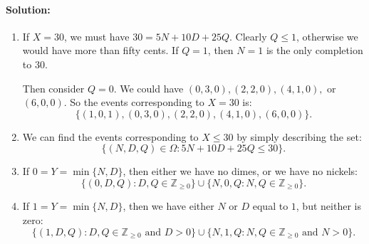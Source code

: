 \documentclass{article}
\begin{document}
\begin{enumerate}
\begin{enumerate}
        \paragraph{Solution: }
        \begin{enumerate}
            \item If $X=30$, we must have $30=5N+10D+25Q$. Clearly  $Q\leq 1$, otherwise we would have more than fifty cents. If $Q=1$, then $N=1$ is the only completion to $30$.

                Then consider $Q=0$. We could have $(0,3,0),(2,2,0),(4,1,0),$ or $(6,0,0)$.
                So the events corresponding to  $X= 30$ is:
                \[
                \{(1,0,1),(0,3,0),(2,2,0),(4,1,0),(6,0,0)\} 
                .\] 
            \item We can find the events corresponding to $X\leq 30$ by simply describing the set:
                 \[
                \{(N,D,Q)\in \Omega: 5N+10D+25Q\leq30\} 
                .\] %
            \item If $0=Y=\min \{N,D\} $, then either we have no dimes, or we have no nickels:
                \[
                    \{(0,D,Q):D,Q\in \mathbb{Z}_{\ge 0}\} \cup \{N,0,Q:N,Q\in \mathbb{Z}_{\ge 0}\} 
                .\] 
            \item If $1=Y=\min \{N,D\} $, then we have either $N$ or $D$ equal to $1$, but neither is zero: %
                \[
                    \{(1,D,Q):D,Q\in \mathbb{Z}_{\ge 0}\text{ and }D>0\} \cup \{N,1,Q:N,Q\in \mathbb{Z}_{\ge 0}\text{ and }N>0\} 
                .\] 
        \end{enumerate}
    \end{enumerate}
\end{enumerate}
\end{document}
